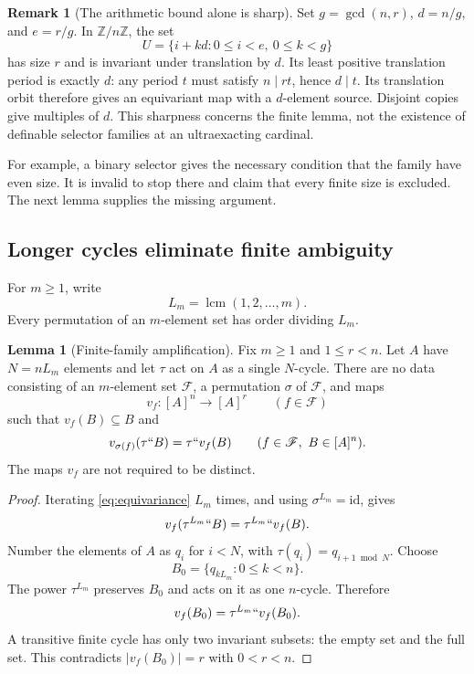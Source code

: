 \documentclass[11pt,letterpaper]{article}
\theoremstyle{definition}
\newtheorem{lemma}[definition]{Lemma}
\newcommand{\id}{\mathrm{id}}
\newcommand{\Lcm}{\operatorname{lcm}}
\newcommand{\FF}{\mathscr F}
\newtheorem{remark}[definition]{Remark}
\begin{document}
\begin{remark}[The arithmetic bound alone is sharp]\label{rem:sharp}
Set $g=\gcd(n,r)$, $d=n/g$, and $e=r/g$. In $\mathbb Z/n\mathbb Z$, the set
\[
 U=\{i+kd:0\leq i<e,\ 0\leq k<g\}
\]
has size $r$ and is invariant under translation by $d$. Its least positive translation period is exactly $d$: any period $t$ must satisfy $n\mid rt$, hence $d\mid t$. Its translation orbit therefore gives an equivariant map with a $d$-element source. Disjoint copies give multiples of $d$. This sharpness concerns the finite lemma, not the existence of definable selector families at an ultraexacting cardinal.
\end{remark}

For example, a binary selector gives the necessary condition that the family have even size. It is invalid to stop there and claim that every finite size is excluded. The next lemma supplies the missing argument.

\subsection{Longer cycles eliminate finite ambiguity}

For $m\geq1$, write
\[
 L_m=\Lcm(1,2,\ldots,m).
\]
Every permutation of an $m$-element set has order dividing $L_m$.

\begin{lemma}[Finite-family amplification]\label{lem:amplification}
Fix $m\geq1$ and $1\leq r<n$. Let $A$ have $N=nL_m$ elements and let $\tau$ act on $A$ as a single $N$-cycle. There are no data consisting of an $m$-element set $\FF$, a permutation $\sigma$ of $\FF$, and maps
\[
 v_f:[A]^n\to[A]^r\qquad(f\in\FF)
\]
such that $v_f(B)\subseteq B$ and
\begin{equation}\label{eq:equivariance}
 v_{\sigma(f)}(\tau``B)=\tau``v_f(B)
 \qquad(f\in\FF,\ B\in[A]^n).
\end{equation}
The maps $v_f$ are not required to be distinct.
\end{lemma}

\begin{proof}
Iterating \eqref{eq:equivariance} $L_m$ times, and using $\sigma^{L_m}=\id$, gives
\[
 v_f(\tau^{L_m}``B)=\tau^{L_m}``v_f(B).
\]
Number the elements of $A$ as $q_i$ for $i<N$, with $\tau(q_i)=q_{i+1\bmod N}$. Choose
\[
 B_0=\{q_{kL_m}:0\leq k<n\}.
\]
The power $\tau^{L_m}$ preserves $B_0$ and acts on it as one $n$-cycle. Therefore
\[
 v_f(B_0)=\tau^{L_m}``v_f(B_0).
\]
A transitive finite cycle has only two invariant subsets: the empty set and the full set. This contradicts $|v_f(B_0)|=r$ with $0<r<n$.
\end{proof}
\end{document}
